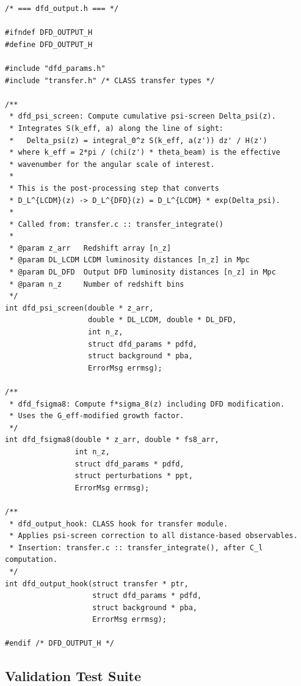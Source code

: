 \documentclass[11pt]{article}
\theoremstyle{definition}
\theoremstyle{remark}
\begin{document}
\begin{lstlisting}[caption={Module 4: Output and post-processing}]
/* === dfd_output.h === */

#ifndef DFD_OUTPUT_H
#define DFD_OUTPUT_H

#include "dfd_params.h"
#include "transfer.h" /* CLASS transfer types */

/**
 * dfd_psi_screen: Compute cumulative psi-screen Delta_psi(z).
 * Integrates S(k_eff, a) along the line of sight:
 *   Delta_psi(z) = integral_0^z S(k_eff, a(z')) dz' / H(z')
 * where k_eff = 2*pi / (chi(z') * theta_beam) is the effective
 * wavenumber for the angular scale of interest.
 *
 * This is the post-processing step that converts
 * D_L^{LCDM}(z) -> D_L^{DFD}(z) = D_L^{LCDM} * exp(Delta_psi).
 *
 * Called from: transfer.c :: transfer_integrate()
 *
 * @param z_arr   Redshift array [n_z]
 * @param DL_LCDM LCDM luminosity distances [n_z] in Mpc
 * @param DL_DFD  Output DFD luminosity distances [n_z] in Mpc
 * @param n_z     Number of redshift bins
 */
int dfd_psi_screen(double * z_arr,
                   double * DL_LCDM, double * DL_DFD,
                   int n_z,
                   struct dfd_params * pdfd,
                   struct background * pba,
                   ErrorMsg errmsg);

/**
 * dfd_fsigma8: Compute f*sigma_8(z) including DFD modification.
 * Uses the G_eff-modified growth factor.
 */
int dfd_fsigma8(double * z_arr, double * fs8_arr,
                int n_z,
                struct dfd_params * pdfd,
                struct perturbations * ppt,
                ErrorMsg errmsg);

/**
 * dfd_output_hook: CLASS hook for transfer module.
 * Applies psi-screen correction to all distance-based observables.
 * Insertion: transfer.c :: transfer_integrate(), after C_l computation.
 */
int dfd_output_hook(struct transfer * ptr,
                    struct dfd_params * pdfd,
                    struct background * pba,
                    ErrorMsg errmsg);

#endif /* DFD_OUTPUT_H */
\end{lstlisting}

\subsection{Validation Test Suite}
\end{document}

